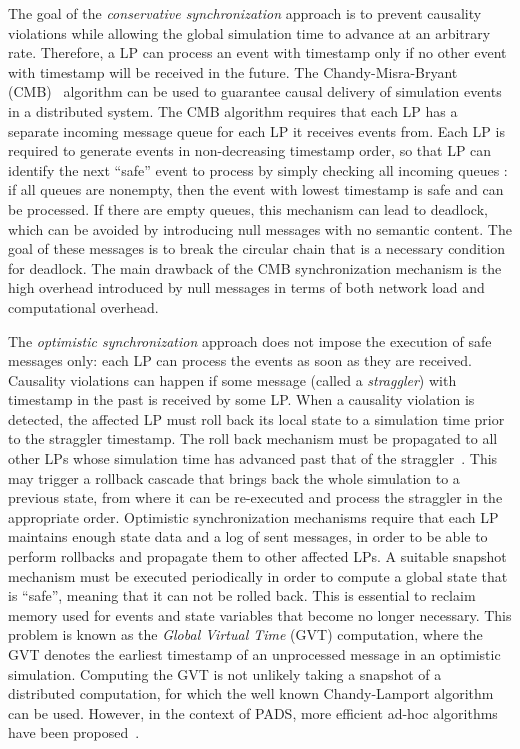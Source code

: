 \documentclass[1p]{elsarticle}
\begin{document}
The goal of the \emph{conservative synchronization} approach is to
prevent causality violations while allowing the global simulation time
to advance at an arbitrary rate. Therefore, a LP can process an event
with timestamp  only if no other event with timestamp  will
be received in the future. The Chandy-Misra-Bryant
(CMB)~\cite{misra86} algorithm can be used to guarantee causal
delivery of simulation events in a distributed system. The CMB
algorithm requires that each LP  has a separate incoming message
queue  for each LP  it receives events from. Each LP is
required to generate events in non-decreasing timestamp order, so that
LP  can identify the next ``safe'' event to process by simply
checking all incoming queues : if all queues are nonempty,
then the event with lowest timestamp  is safe and can be processed.
If there are empty queues, this mechanism can lead to deadlock, which
can be avoided by introducing null messages with no semantic
content. The goal of these messages is to break the circular chain
that is a necessary condition for deadlock. The main drawback of the
CMB synchronization mechanism is the high overhead introduced by null
messages in terms of both network load and computational overhead.

The \emph{optimistic synchronization} approach does not impose the
execution of safe messages only: each LP can process the events as
soon as they are received. Causality violations can happen if some
message (called a \emph{straggler}) with timestamp in the past is
received by some LP. When a causality violation is detected, the
affected LP must roll back its local state to a simulation time prior
to the straggler timestamp. The roll back mechanism must be propagated
to all other LPs whose simulation time has advanced past that of the
straggler~\cite{timewarp,quaglia2003}. This may trigger a rollback
cascade that brings back the whole simulation to a previous state,
from where it can be re-executed and process the straggler in the
appropriate order.
Optimistic synchronization mechanisms require that each LP maintains
enough state data and a log of sent messages, in order to be able to
perform rollbacks and propagate them to other affected LPs. A suitable
snapshot mechanism must be executed periodically in order to compute a
global state that is ``safe'', meaning that it can not be rolled back.
This is essential to reclaim memory used for events and state
variables that become no longer necessary. This problem is known as
the \emph{Global Virtual Time} (GVT) computation, where the GVT
denotes the earliest timestamp of an unprocessed message in an
optimistic simulation. Computing the GVT is not unlikely taking a
snapshot of a distributed computation, for which the well known
Chandy-Lamport algorithm~\cite{ChandyL85} can be used. However, in the
context of PADS, more efficient ad-hoc algorithms have been
proposed~\cite{gvt95}.
\end{document}
